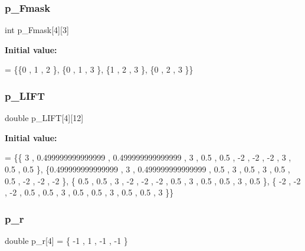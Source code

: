 \subsubsection{\texorpdfstring{p\+\_\+\+Fmask}{p\_Fmask}}
{\footnotesize\ttfamily int p\+\_\+\+Fmask\mbox{[}4\mbox{]}\mbox{[}3\mbox{]}}

{\bfseries Initial value\+:}
\begin{DoxyCode}
= \{\{0 , 1 , 2 \},
\{0 , 1 , 3 \},
\{1 , 2 , 3 \},
\{0 , 2 , 3 \}\}
\end{DoxyCode}
\mbox{\label{a00479_a90a883d002d6c861ad00cd673d42c829}} 
\subsubsection{\texorpdfstring{p\+\_\+\+L\+I\+FT}{p\_LIFT}}
{\footnotesize\ttfamily double p\+\_\+\+L\+I\+FT\mbox{[}4\mbox{]}\mbox{[}12\mbox{]}}

{\bfseries Initial value\+:}
\begin{DoxyCode}
= \{\{                3 , 0.499999999999999 , 0.499999999999999 ,                 3 ,               0.5 ,    
                 0.5 ,                -2 ,                -2 ,                -2 ,                 3 ,            
         0.5 ,               0.5 \},
\{0.499999999999999 ,                 3 , 0.499999999999999 ,               0.5 ,                 3 ,       
              0.5 ,                 3 ,               0.5 ,               0.5 ,                -2 ,               
       -2 ,                -2 \},
\{              0.5 ,               0.5 ,                 3 ,                -2 ,                -2 ,       
               -2 ,               0.5 ,                 3 ,               0.5 ,               0.5 ,               
        3 ,               0.5 \},
\{               -2 ,                -2 ,                -2 ,               0.5 ,               0.5 ,       
                3 ,               0.5 ,               0.5 ,                 3 ,               0.5 ,               
      0.5 ,                 3 \}\}
\end{DoxyCode}
\mbox{\label{a00479_a49c3e9deef3ce181426dc3c9d2b6a8e0}} 
\subsubsection{\texorpdfstring{p\+\_\+r}{p\_r}}
{\footnotesize\ttfamily double p\+\_\+r\mbox{[}4\mbox{]} = \{ -\/1 , 1 , -\/1 , -\/1 \}}


